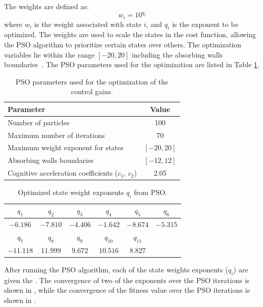 The weights are defined as:
\begin{equation}
    w_i = 10^{q_i}
\end{equation}
where $w_i$ is the weight associated with state $i$, and $q_i$ is the exponent to be optimized. The weights are used to scale the states in the cost function, allowing the PSO algorithm to prioritize certain states over others. The optimization variables lie within the range $[-20,20]$ including the absorbing walls boundaries~\cite{robinsonParticleSwarmOptimization2004}. The PSO parameters used for the optimization are listed in Table \ref{tab:PSO_Parameters}.

\begin{table}[t!]
    \centering
    \caption{PSO parameters used for the optimization of the control gains.}
    \label{tab:PSO_Parameters}
    \begin{tabular}{|l|c|}
        \hline
        \textbf{Parameter} & \textbf{Value}\\
        \hline\hline
        Number of particles & 100\\
        Maximum number of iterations & 70\\
        Maximum weight exponent for states & $[-20, 20]$\\
        Absorbing walls boundaries & $[-12, 12]$\\
        Cognitive acceleration coefficients ($c_1$, $c_2$) & 2.05\\
        \hline
    \end{tabular}
\end{table}

\begin{table}[h!]
    \centering
    \caption{Optimized state weight exponents $q_i$ from PSO.}
    \label{tab:PSO_Weights}
    \begin{tabular}{|c|c|c|c|c|c|}
        \hline
        $q_1$ & $q_2$ & $q_3$ & $q_4$ & $q_5$ & $q_6$\\
        \hline
        $-6.186$ & $-7.810$ & $-4.406$ & $-1.642$ & $-8.674$ & $-5.315$\\
        \hline
        $q_7$ & $q_8$ & $q_9$ & $q_{10}$ & $q_{11}$ &\\
        \hline
        $-11.118$ & $11.999$ & $9.672$ & $10.516$ & $8.827$ & \\
        \hline
    \end{tabular}
\end{table}

After running the PSO algorithm, each of the state weights exponents ($q_i$) are given the . The convergence of two of the exponents over the PSO iterations is shown in , while the convergence of the fitness value over the PSO iterations is shown in .


